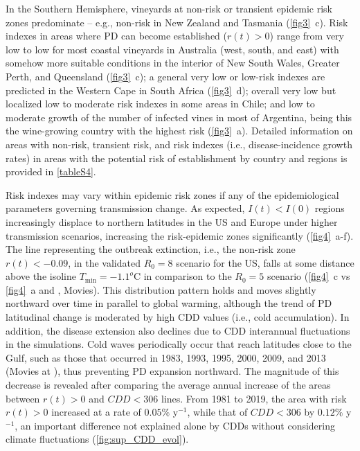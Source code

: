     In the Southern Hemisphere, vineyards at non-risk or transient
    epidemic risk zones predominate -- e.g., non-risk in New Zealand and
    Tasmania (\cref{fig3}~\textcolor{ref_color}{c}). Risk indexes in areas
    where PD can become
    established ($r(t) > 0$) range from very low to low for most coastal
    vineyards in Australia (west, south, and east) with somehow more suitable
    conditions in the interior of New South Wales, Greater Perth, and
    Queensland (\cref{fig3}~\textcolor{ref_color}{c}); a general very low or
    low-risk indexes are
    predicted in the Western Cape in South Africa
    (\cref{fig3}~\textcolor{ref_color}{d}); overall
    very low but localized low to moderate risk indexes in some areas in
    Chile; and low to moderate growth of the number of infected vines in most
    of Argentina, being this the wine-growing country with the highest risk
    (\cref{fig3}~\textcolor{ref_color}{a}). Detailed information on areas with
    non-risk, transient
    risk, and risk indexes (i.e., disease-incidence growth rates) in areas with
    the potential risk of establishment by country and regions is provided in
    \cref{tableS4}.

    Risk indexes may vary within epidemic risk zones if any of the
    epidemiological parameters governing transmission change. As expected,
$I(t) < I(0)$ regions increasingly displace to northern latitudes in the US
    and Europe under higher transmission scenarios, increasing the
    risk-epidemic zones significantly (\cref{fig4}~\textcolor{ref_color}{a-f}).
    The line representing
    the outbreak extinction, i.e., the non-risk zone $r(t)<-0.09$, in the
    validated $R_0=8$ scenario for the US, falls at some distance above the
    isoline $T_{\textrm{min}} = -1.1^o$C in comparison to the $R_0=5$ scenario
    (\cref{fig4}~\textcolor{ref_color}{c} vs
    \cref{fig4}~\textcolor{ref_color}{a} and \cite{Webpage}, Movies). This
    distribution pattern holds and moves slightly northward over time in
    parallel to global warming, although the trend of PD latitudinal change is
    moderated by high CDD values (i.e., cold accumulation). In addition, the
    disease extension also declines due to CDD interannual fluctuations in the
    simulations. Cold waves periodically occur that reach latitudes close to
    the Gulf, such as those that occurred in 1983, 1993, 1995, 2000, 2009, and
    2013 (Movies at \cite{Webpage}), thus preventing PD expansion northward.
    The magnitude of this decrease is revealed after comparing the average
    annual increase of the areas between $r(t) > 0$ and $CDD < 306$ lines. From
    1981 to 2019, the area with risk $r(t) > 0$ increased at a rate of $0.05\%$
    y$^{-1}$, while that of $CDD < 306$ by $0.12\%$ y$^{-1}$, an important
    difference not explained alone by CDDs without considering climate
    fluctuations (\cref{fig:sup_CDD_evol}).

